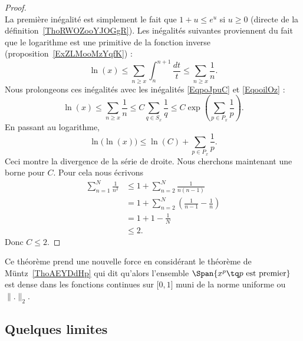 \begin{proof}
\begin{equation}
	\end{equation}
	La première inégalité est simplement le fait que \( 1+u\leq e^u\) si \( u\geq 0\) (directe de la définition~\ref{ThoRWOZooYJOGgR}). Les inégalités suivantes proviennent du fait que le logarithme est une primitive de la fonction inverse (proposition~\ref{ExZLMooMzYqfK}) :
	\begin{equation}
		\ln(x)\leq \sum_{n\geq x}\int_{n}^{n+1}\frac{dt}{ t }\leq \sum_{n\geq x}\frac{1}{ n }.
	\end{equation}
	Nous prolongeons ces inégalités avec les inégalités \eqref{EqpoJpuC} et \eqref{EqooilOz} :
	\begin{equation}
		\ln(x)\leq \sum_{n\geq x}\frac{1}{ n }\leq C\sum_{q\in S_x}\frac{1}{ q }\leq C \exp\left( \sum_{p\in P_x}\frac{1}{ p } \right).
	\end{equation}
	En passant au logarithme,
	\begin{equation}
		\ln\big( \ln(x) \big)\leq\ln(C)+\sum_{p\in P_x}\frac{1}{ p }.
	\end{equation}
	Ceci montre la divergence de la série de droite. Nous cherchons maintenant une borne pour \( C\). Pour cela nous écrivons
	\begin{subequations}
		\begin{align}
			\sum_{n=1}^N\frac{1}{ n^2 } & \leq 1+\sum_{n=2}^N\frac{1}{ n(n-1) }                         \\
			                            & =1+\sum_{n=2}^N\left( \frac{1}{ n-1 }-\frac{1}{ n } \right) \\
			                            & =1+1-\frac{1}{ N }                                          \\
			                            & \leq 2.
		\end{align}
	\end{subequations}
	Donc \( C\leq 2\).
\end{proof}
Ce théorème prend une nouvelle force en considérant le théorème de Müntz~\ref{ThoAEYDdHp} qui dit qu'alors l'ensemble \( \Span\{ x^p\tq  p\text{ est premier} \}\) est dense dans les fonctions continues sur \( \mathopen[ 0 , 1 \mathclose]\) muni de la norme uniforme ou \( \| . \|_2\).

\subsection{Quelques limites}

